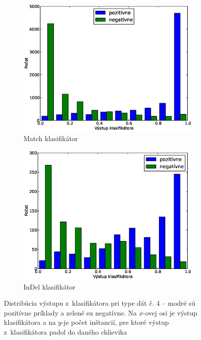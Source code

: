 \begin{figure}[htp]
        \centering
        \begin{subfigure}[t]{0.4\textwidth}
                \includegraphics[width=\textwidth]{images/clf_fi/randomforest_combined_5_test}
                \caption{Match klasifikátor}
                \label{fig:datatype4-out-m}
        \end{subfigure}%
        \qquad\qquad %
        \begin{subfigure}[t]{0.4\textwidth}
                \includegraphics[width=\textwidth]{images/clf_fi/randomforest_combined_5_indel_test}
                \caption{InDel klasifikátor}
                \label{fig:datatype4-out-i}
        \end{subfigure}
        \caption[Distribúcia výstupu z~klasifikátora pri type dát č. 4]{Distribúcia výstupu z~klasifikátora pri type dát č. 4 -- modré sú pozitívne príklady a zelené su negatívne. Na $x$-ovej osi je výstup klasifikátora a na $y$-je počet inštancií, pre ktoré výstup z~klasifikátora padol do daného chlievika}
        \label{fig:datatype4-out}
\end{figure}

